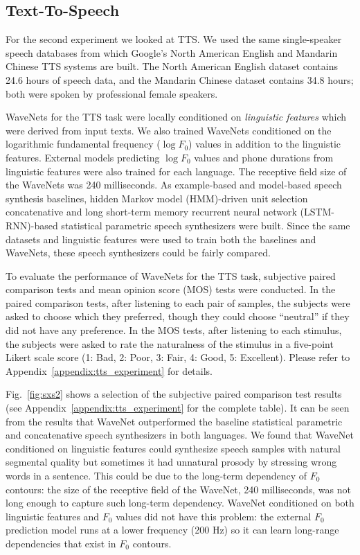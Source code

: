 \documentclass{article}
\newcommand{\figref}[1]{Fig.~\ref{#1}}
\begin{document}
\subsection{Text-To-Speech}
For the second experiment we looked at TTS.  
We used the same single-speaker speech databases from which Google's North American English and Mandarin Chinese TTS systems are built.
The North American English dataset contains 24.6 hours of speech data, and the Mandarin Chinese dataset contains 34.8 hours; both were spoken by professional female speakers.

WaveNets for the TTS task were locally conditioned on \emph{linguistic features} which were derived from input texts.
We also trained WaveNets conditioned on the logarithmic fundamental frequency ($\log F_0$) values in addition to the linguistic features.
External models predicting $\log F_0$ values and phone durations from linguistic features were also trained for each language.
The receptive field size of the WaveNets was 240 milliseconds.
As example-based and model-based speech synthesis baselines, hidden Markov model (HMM)-driven unit selection concatenative \citep{Xavi_Barracuda_interspeech}
and long short-term memory recurrent neural network (LSTM-RNN)-based statistical parametric \citep{Zen_LSTMprod_Interspeech} speech synthesizers were built.
Since the same datasets and linguistic features were used to train both the baselines and WaveNets, these speech synthesizers could be fairly compared.

To evaluate the performance of WaveNets for the TTS task, subjective paired comparison tests and mean opinion score (MOS) tests were conducted.
In the paired comparison tests, after listening to each pair of samples, the subjects were asked to choose which they preferred, though they could choose ``neutral'' if they did not have any preference.
In the MOS tests, after listening to each stimulus, the subjects were asked to rate the naturalness of the stimulus in a five-point Likert scale score (1: Bad, 2: Poor, 3: Fair, 4: Good, 5: Excellent).
Please refer to Appendix~\ref{appendix:tts_experiment} for details.

\figref{fig:sxs2} shows a selection of the subjective paired comparison test results (see  Appendix~\ref{appendix:tts_experiment} for the complete table).
It can be seen from the results that WaveNet outperformed the baseline statistical parametric and concatenative speech synthesizers in both languages.
We found that WaveNet conditioned on linguistic features could synthesize speech samples with natural segmental quality but sometimes it had unnatural prosody by stressing wrong words in a sentence.
This could be due to the long-term dependency of $F_0$ contours: the size of the receptive field of the WaveNet, 240 milliseconds, was not long enough to capture such long-term dependency.  
WaveNet conditioned on both linguistic features and $F_0$ values did not have this problem: the external $F_0$ prediction model runs at a lower frequency (200 Hz) so it can learn long-range dependencies that exist in $F_0$ contours.
 
\end{document}
